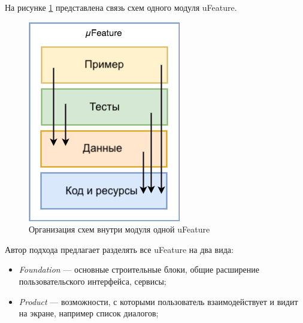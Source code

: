 На рисунке \ref{sec:analysis:research:mobArch:ufeature:featureDependencyDiagram} представлена связь схем одного модуля uFeature.

\begin{figure}[h]
  \centering
    \includegraphics{inc/img/ufeature-diagram.png}
  \caption{Организация схем внутри модуля одной uFeature}
  \label{sec:analysis:research:mobArch:ufeature:featureDependencyDiagram}
\end{figure}

Автор подхода предлагает разделять все uFeature на два вида:

\begin{itemize}
	\item \emph{Foundation} --- основные строительные блоки, общие расширение пользовательского интерфейса, сервисы;
	\item \emph{Product} --- возможности, с которыми пользователь взаимодействует и видит на экране, например список диалогов;
\end{itemize}

